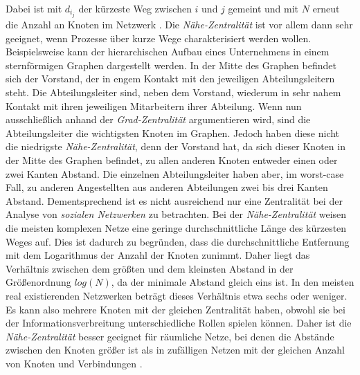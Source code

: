 Dabei ist mit $d_i_j$ der kürzeste Weg zwischen $i$ und $j$ gemeint und mit $N$ erneut die Anzahl an Knoten im Netzwerk \cite{SpringerElbert}. Die \textit{Nähe-Zentralität} ist vor allem dann sehr geeignet, wenn Prozesse über kurze Wege charakterisiert werden wollen. Beispielsweise kann der hierarchischen Aufbau eines Unternehmens in einem sternförmigen Graphen dargestellt werden. In der Mitte des Graphen befindet sich der Vorstand, der in engem Kontakt mit den jeweiligen Abteilungsleitern steht. Die Abteilungsleiter sind, neben dem Vorstand, wiederum in sehr nahem Kontakt mit ihren jeweiligen Mitarbeitern ihrer Abteilung. Wenn nun ausschließlich anhand der \textit{Grad-Zentralität} argumentieren wird, sind die Abteilungsleiter die wichtigsten Knoten im Graphen. Jedoch haben diese nicht die niedrigste \textit{Nähe-Zentralität}, denn der Vorstand hat, da sich dieser Knoten in der Mitte des Graphen befindet, zu allen anderen Knoten entweder einen oder zwei Kanten Abstand. Die einzelnen Abteilungsleiter haben aber, im worst-case Fall, zu anderen Angestellten aus anderen Abteilungen zwei bis drei Kanten Abstand. Dementsprechend ist es nicht ausreichend nur eine Zentralität bei der Analyse von \textit{sozialen Netzwerken} zu betrachten. Bei der \textit{Nähe-Zentralität} weisen die meisten komplexen Netze eine geringe durchschnittliche Länge des kürzesten Weges auf. Dies ist dadurch zu begründen, dass die durchschnittliche Entfernung mit dem Logarithmus der Anzahl der Knoten zunimmt. 
Daher liegt das Verhältnis zwischen dem größten und dem kleinsten Abstand
in der Größenordnung $log(N)$, da der minimale Abstand gleich eins ist. In den meisten real existierenden
Netzwerken beträgt dieses Verhältnis etwa sechs oder weniger. Es kann also mehrere Knoten mit der gleichen
Zentralität haben, obwohl sie bei der Informationsverbreitung unterschiedliche Rollen spielen können. Daher ist die \textit{Nähe-Zentralität} besser geeignet für räumliche Netze, bei denen die Abstände zwischen den Knoten größer ist als in zufälligen Netzen mit der gleichen Anzahl von
Knoten und Verbindungen \cite{SpringerElbert}.\\

